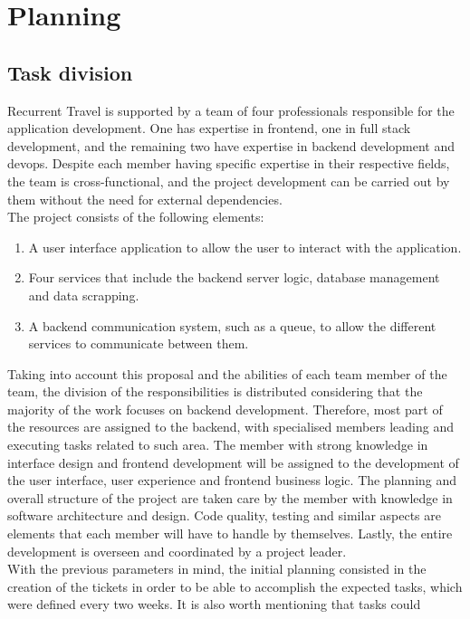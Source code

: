 \documentclass[../memory.tex]{subfiles}
\begin{document}
\chapter{Planning}
\section{Task division}
Recurrent Travel is supported by a team of four professionals responsible for
the application development. One has expertise in frontend, one in full stack
development, and the remaining two have expertise in backend development and
devops. Despite each member having specific expertise in their respective
fields, the team is cross-functional, and the project development can be carried
out by them without the need for external dependencies.
\\
The project consists of the following elements:
\begin{enumerate}[label = -]
	\item A user interface application to allow the user to interact with the
	      application.
	\item Four services that include the backend server logic, database management
	      and data scrapping.
	\item A backend communication system, such as a queue, to allow the different
	      services to communicate between them.
\end{enumerate}
Taking into account this proposal and the abilities of each team member of the
team, the division of the responsibilities is distributed considering that the
majority of the work focuses on backend development. Therefore, most part of the
resources are assigned to the backend, with specialised members leading and
executing tasks related to such area. The member with strong knowledge in
interface design and frontend development will be assigned to the development of
the user interface, user experience and frontend business logic. The planning
and overall structure of the project are taken care by the member with knowledge
in software architecture and design. Code quality, testing and similar aspects
are elements that each member will have to handle by themselves. Lastly, the
entire development is overseen and coordinated by a project leader.
\\[8pt]
With the previous parameters in mind, the initial planning consisted in the
creation of the tickets in order to be able to accomplish the expected tasks,
which were defined every two weeks. It is also worth mentioning that tasks could
\end{document}
